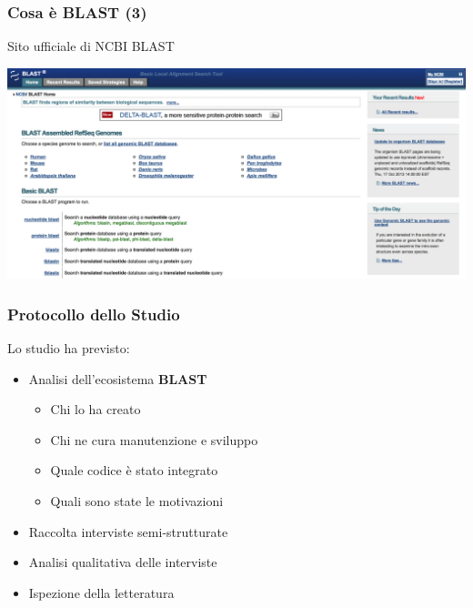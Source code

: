 \begin{frame}\frametitle{Cosa è BLAST (3)}

\begin{center}
\Large{Sito ufficiale di NCBI BLAST}
\end{center}

\begin{center}
    \includegraphics[scale=.12]{img/ncbi_blast}
\end{center}

\end{frame}

\begin{frame}\frametitle{Protocollo dello Studio}

Lo studio ha previsto:

\begin{itemize}[<+->]
\itemsep1pt\parskip0pt
\item
  Analisi dell'ecosistema \alert{\textbf{BLAST}}

  \begin{itemize}[<+->]
  \itemsep1pt\parskip0pt
  \item
    Chi lo ha creato
  \item
    Chi ne cura manutenzione e sviluppo
  \item
    Quale codice è stato integrato
  \item
    Quali sono state le motivazioni
  \end{itemize}
\item
  Raccolta interviste semi-strutturate
\item
  Analisi qualitativa delle interviste
\item
  Ispezione della letteratura
\end{itemize}

\end{frame}

